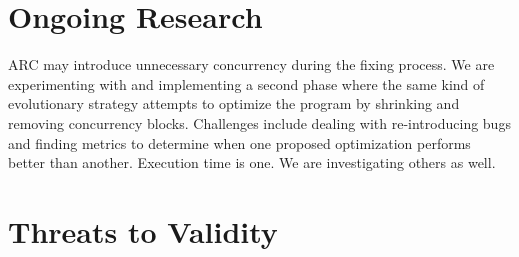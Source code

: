 \documentclass{llncs}
\begin{document}
\section{Ongoing Research}\label{sec:ongoing}

ARC may introduce unnecessary concurrency during the fixing process.
We are experimenting with and implementing a second phase where the
same kind of evolutionary strategy attempts to optimize the program by
shrinking and removing concurrency blocks.  Challenges include
dealing with re-introducing bugs and finding metrics to determine when
one proposed optimization performs better than another.  Execution time is
one.  We are investigating others as well.


\section{Threats to Validity}
\label{sec:threats}
\end{document}
